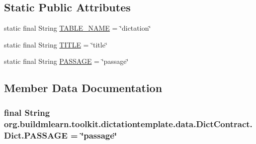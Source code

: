 \subsection*{Static Public Attributes}
\begin{DoxyCompactItemize}
\item 
static final String \hyperlink{classorg_1_1buildmlearn_1_1toolkit_1_1dictationtemplate_1_1data_1_1DictContract_1_1Dict_a2bd71896773218ddf46d5d567f00950b}{T\+A\+B\+L\+E\+\_\+\+N\+A\+ME} = \char`\"{}dictation\char`\"{}
\item 
static final String \hyperlink{classorg_1_1buildmlearn_1_1toolkit_1_1dictationtemplate_1_1data_1_1DictContract_1_1Dict_aa64523b372feca9a4ebff43f44d0b4c4}{T\+I\+T\+LE} = \char`\"{}title\char`\"{}
\item 
static final String \hyperlink{classorg_1_1buildmlearn_1_1toolkit_1_1dictationtemplate_1_1data_1_1DictContract_1_1Dict_a17f7e209687eae930302751be31011e2}{P\+A\+S\+S\+A\+GE} = \char`\"{}passage\char`\"{}
\end{DoxyCompactItemize}


\subsection{Member Data Documentation}
\subsubsection[{\texorpdfstring{P\+A\+S\+S\+A\+GE}{PASSAGE}}]{\setlength{\rightskip}{0pt plus 5cm}final String org.\+buildmlearn.\+toolkit.\+dictationtemplate.\+data.\+Dict\+Contract.\+Dict.\+P\+A\+S\+S\+A\+GE = \char`\"{}passage\char`\"{}\hspace{0.3cm}{\ttfamily [static]}}\hypertarget{classorg_1_1buildmlearn_1_1toolkit_1_1dictationtemplate_1_1data_1_1DictContract_1_1Dict_a17f7e209687eae930302751be31011e2}{}\label{classorg_1_1buildmlearn_1_1toolkit_1_1dictationtemplate_1_1data_1_1DictContract_1_1Dict_a17f7e209687eae930302751be31011e2}
